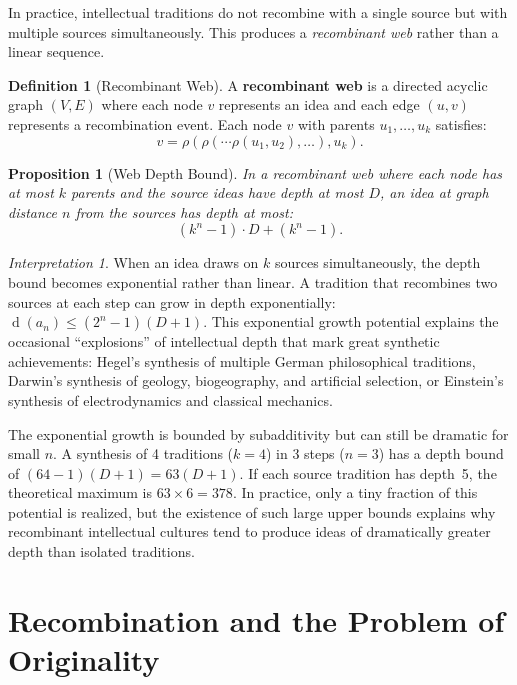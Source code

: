 \documentclass[11pt,openany]{book}
\theoremstyle{definition}
\newtheorem{definition}[axiom]{Definition}
\theoremstyle{plain}
\newtheorem{proposition}[axiom]{Proposition}
\theoremstyle{remark}
\newtheorem{interpretation}[axiom]{Interpretation}
\newcommand{\depth}{\operatorname{d}}       %
\begin{document}
In practice, intellectual traditions do not recombine with a single source but with multiple sources simultaneously. This produces a \emph{recombinant web} rather than a linear sequence.

\begin{definition}[Recombinant Web]
A \textbf{recombinant web} is a directed acyclic graph $(V, E)$ where each node $v$ represents an idea and each edge $(u, v)$ represents a recombination event. Each node $v$ with parents $u_1, \ldots, u_k$ satisfies:
\[
v = \rho(\rho(\cdots \rho(u_1, u_2), \ldots), u_k).
\]
\end{definition}

\begin{proposition}[Web Depth Bound]
In a recombinant web where each node has at most $k$ parents and the source ideas have depth at most $D$, an idea at graph distance $n$ from the sources has depth at most:
\[
(k^n - 1) \cdot D + (k^n - 1).
\]
\end{proposition}

\begin{interpretation}
When an idea draws on $k$ sources simultaneously, the depth bound becomes exponential rather than linear. A tradition that recombines two sources at each step can grow in depth exponentially: $\depth(a_n) \leq (2^n - 1)(D + 1)$. This exponential growth potential explains the occasional ``explosions'' of intellectual depth that mark great synthetic achievements: Hegel's synthesis of multiple German philosophical traditions, Darwin's synthesis of geology, biogeography, and artificial selection, or Einstein's synthesis of electrodynamics and classical mechanics.

The exponential growth is bounded by subadditivity but can still be dramatic for small $n$. A synthesis of 4 traditions ($k = 4$) in 3 steps ($n = 3$) has a depth bound of $(64 - 1)(D + 1) = 63(D + 1)$. If each source tradition has depth~5, the theoretical maximum is $63 \times 6 = 378$. In practice, only a tiny fraction of this potential is realized, but the existence of such large upper bounds explains why recombinant intellectual cultures tend to produce ideas of dramatically greater depth than isolated traditions.
\end{interpretation}

\section{Recombination and the Problem of Originality}
\end{document}
